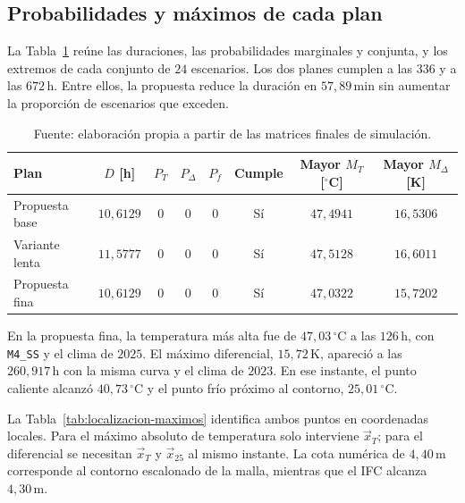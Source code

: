 \subsection{Probabilidades y máximos de cada plan}
La Tabla~\ref{tab:resultados-planes} reúne las duraciones, las probabilidades marginales y conjunta, y los extremos de cada conjunto de $24$ escenarios. Los dos planes cumplen a las $336$ y a las $672\,\mathrm h$. Entre ellos, la propuesta reduce la duración en $57{,}89\,\mathrm{min}$ sin aumentar la proporción de escenarios que exceden.
\begin{table}[htbp]
  \centering
  \caption{Duración, probabilidades y extremos del conjunto a $672\,\mathrm h$}
  \label{tab:resultados-planes}
  \small
  \setlength{\tabcolsep}{4pt}
  \begin{tabular}{lccccccc}
    \toprule
    Plan & $D$ [h] & $P_T$ & $P_\Delta$ & $P_f$ & Cumple & Mayor $M_T$ [$^\circ$C] & Mayor $M_\Delta$ [K] \\
    \midrule
    Propuesta base & $10{,}6129$ & $0$ & $0$ & $0$ & Sí & $47{,}4941$ & $16{,}5306$ \\
    Variante lenta & $11{,}5777$ & $0$ & $0$ & $0$ & Sí & $47{,}5128$ & $16{,}6011$ \\
    Propuesta fina & $10{,}6129$ & $0$ & $0$ & $0$ & Sí & $47{,}0322$ & $15{,}7202$ \\
    \bottomrule
  \end{tabular}
  \captionsetup{skip=2pt}
  \caption*{Fuente: elaboración propia a partir de las matrices finales de simulación.}
\end{table}
En la propuesta fina, la temperatura más alta fue de $47{,}03\,^\circ\mathrm C$ a las $126\,\mathrm h$, con \texttt{M4\_SS} y el clima de $2025$. El máximo diferencial, $15{,}72\,\mathrm K$, apareció a las $260{,}917\,\mathrm h$ con la misma curva y el clima de $2023$. En ese instante, el punto caliente alcanzó $40{,}73\,^\circ\mathrm C$ y el punto frío próximo al contorno, $25{,}01\,^\circ\mathrm C$.

La Tabla~\ref{tab:localizacion-maximos} identifica ambos puntos en coordenadas locales. Para el máximo absoluto de temperatura solo interviene $\vec x_T$; para el diferencial se necesitan $\vec x_T$ y $\vec x_{25}$ al mismo instante. La cota numérica de $4{,}40\,\mathrm m$ corresponde al contorno escalonado de la malla, mientras que el IFC alcanza $4{,}30\,\mathrm m$.


